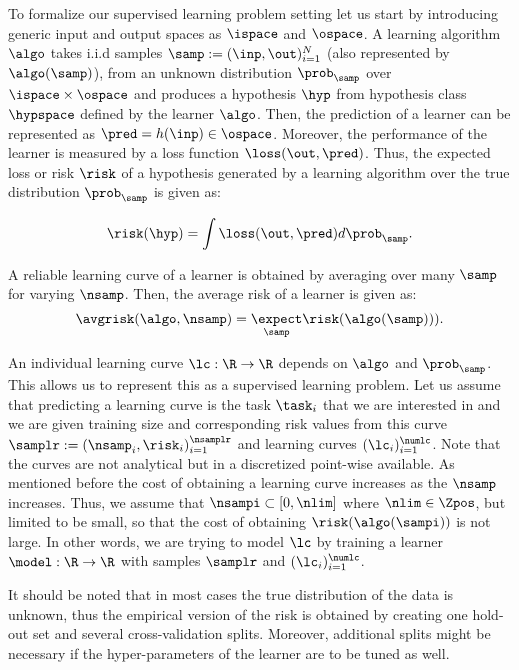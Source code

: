 To formalize our supervised learning problem setting let us start by introducing generic input and output spaces as $\ispace$ and $\ospace$. A learning algorithm $\algo$ takes i.i.d samples $\samp:=(\inp,\out)_{i=1}^{N}$ (also represented by$\algo(\samp)$), from an unknown distribution $\prob_{\samp}$ over $\ispace \times \ospace$ and produces a hypothesis $\hyp$ from hypothesis class $\hypspace$ defined by the learner $\algo$. Then, the prediction of a learner can be represented as $\pred=h(\inp)\in\ospace$. Moreover, the performance of the learner is measured by a loss function $\loss(\out,\pred)$. Thus, the expected loss or risk $\risk$ of a hypothesis generated by a learning algorithm over the true distribution $\prob_{\samp}$ is given as:

\begin{equation}
 \risk(\hyp) = \int\loss(\out,\pred)d\prob_{\samp}.
\end{equation}


A reliable learning curve of a learner is obtained by averaging over many $\samp$ for varying $\nsamp$. Then, the average risk of a learner is given as:
\begin{equation}
 \avgrisk(\algo, \nsamp) = \underset{{\samp}}\expect\risk(\algo(\samp))).
\end{equation}

An individual learning curve $\lc:\R\to\R$ depends on $\algo$ and $\prob_{\samp}$. This allows us to represent this as a supervised learning problem. Let us assume that predicting a learning curve is the task $\task_i$ that we are interested in and we are given training size and corresponding risk values from this curve $\samplr:=(\nsamp_i,\risk_i)_{i=1}^{\nsamplr}$ and learning curves $(\lc_i)_{i=1}^\numlc$. Note that the curves are not analytical but in a discretized point-wise available. As mentioned before the cost of obtaining a learning curve increases as the $\nsamp$ increases. Thus, we assume that $\nsampi\subset[0,\nlim]$ where $\nlim\in\Zpos$, but limited to be small, so that the cost of obtaining $\risk(\algo(\sampi))$ is not large. In other words, we are trying to model $\lc$ by training a learner $\model:\R\to\R$ with samples $\samplr$ and $(\lc_i)_{i=1}^\numlc$.

It should be noted that in most cases the true distribution of the data is unknown, thus the empirical version of the risk is obtained by creating one hold-out set and several cross-validation splits. Moreover, additional splits might be necessary if the hyper-parameters of the learner are to be tuned as well. 


